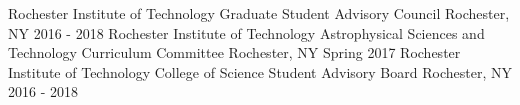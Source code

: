 \begin{cventries}
  \cventry
    {Rochester Institute of Technology}
    {Graduate Student Advisory Council}
    {Rochester, NY}
    {2016 - 2018}
    {
    }
  \cventry
    {Rochester Institute of Technology}
    {Astrophysical Sciences and Technology Curriculum Committee}
    {Rochester, NY}
    {Spring 2017}
    {
    }
  \cventry
    {Rochester Institute of Technology}
    {College of Science Student Advisory Board}
    {Rochester, NY}
    {2016 - 2018}
    {
    }
\end{cventries}
